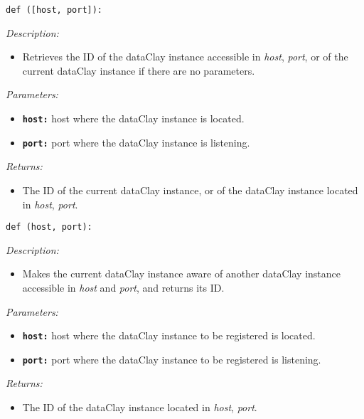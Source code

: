 \begin{dBox}
\texttt{def ([host, port]):}
\LINE

{\it Description:}

\begin{itemize}
    \item Retrieves the ID of the dataClay instance accessible in \textit{host}, \textit{port}, or of the current dataClay instance if there are no parameters.
\end{itemize}

{\it Parameters:}

\begin{itemize}
  \item \texttt{\bfseries host:} host where the dataClay instance is located.
  \item \texttt{\bfseries port:} port where the dataClay instance is listening.
\end{itemize}

{\it Returns:}

\begin{itemize}
 \item The ID of the current dataClay instance, or of the dataClay instance located in \textit{host}, \textit{port}.
\end{itemize}

\end{dBox}


\begin{dBox}
\texttt{def (host, port):}
\LINE

{\it Description:}

\begin{itemize}
    \item Makes the current dataClay instance aware of another dataClay instance accessible in \textit{host} and \textit{port}, and returns its ID.
\end{itemize}

{\it Parameters:}

\begin{itemize}
  \item \texttt{\bfseries host:} host where the dataClay instance to be registered is located.
  \item \texttt{\bfseries port:} port where the dataClay instance to be registered is listening.
\end{itemize}

{\it Returns:}

\begin{itemize}
 \item The ID of the dataClay instance located in \textit{host}, \textit{port}.
\end{itemize}

\end{dBox}

